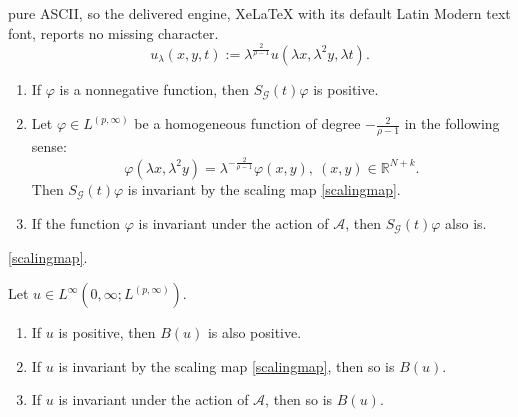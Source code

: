 \documentclass[10pt,a4paper]{amsart}
\newcommand{\R}{\mathbb{R}}
\begin{document}
pure ASCII, so the delivered engine, XeLaTeX with its default Latin Modern text font, reports no missing character.
\begin{equation}\label{scalingmap}
	u_{\lambda}(x,y,t):=\lambda^{\frac{2}{\rho-1}}u(\lambda x, \lambda^2 y, \lambda t).
\end{equation}

\begin{lemma}\label{scalor}
	\begin{enumerate}
		\item[(a)] If $\varphi$ is a nonnegative function, then $S_\mathcal{G}(t)\varphi$ is positive.
		\item[(b)] Let $\varphi \in L^{(p, \infty)}$ be a homogeneous function of degree $-\frac{2}{\rho-1}$ in the following sense:
		\begin{equation}\label{homog}
			\varphi(\lambda x, \lambda^2 y) = \lambda^{-\frac{2}{\rho-1}} \varphi(x,y),  \ (x,y)\in\R^{N+k} .
		\end{equation}
		Then $S_\mathcal{G}(t)\varphi$ is invariant by the scaling map \eqref{scalingmap}.
		\item[(c)] If the function $\varphi$ is invariant under the action of $\mathcal{A}$, then $S_\mathcal{G}(t)\varphi$ also is.
	\end{enumerate}
	\eqref{scalingmap}.
\end{lemma}

\begin{lemma}\label{scalb}
	Let $u \in L^\infty(0,\infty; L^{(p, \infty)})$.
	\begin{enumerate}
		\item[(a)] If $u$ is positive, then $B(u)$ is also positive.
		\item[(b)] If $u$ is invariant by the scaling map \eqref{scalingmap}, then so is $B(u)$.
		\item[(c)] If $u$ is invariant under the action of $\mathcal{A}$, then so is $B(u)$.
	\end{enumerate} 
\end{lemma}
\end{document}
